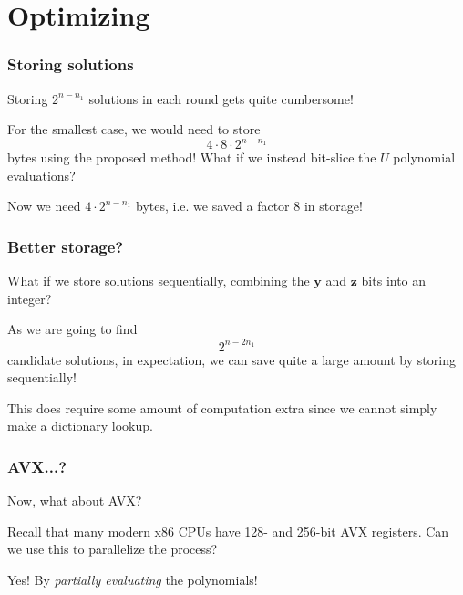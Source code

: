 \documentclass{beamer}
\begin{document}
\section{Optimizing}
    \begin{frame}
        \frametitle{Storing solutions}
        Storing $2^{n - n_1}$ solutions in each round gets quite cumbersome!
        
        \pause 

        For the smallest case, we would need to store 
        $$
            4 \cdot 8 \cdot 2^{n - n_1}
        $$
        bytes using the proposed method! What if we instead bit-slice the $U$ polynomial evaluations?

        \pause 

        Now we need $4\cdot 2^{n - n_1}$ bytes, i.e. we saved a factor 8 in storage!
    \end{frame}


    \begin{frame}
        \frametitle{Better storage?}
        What if we store solutions sequentially, combining the $\mathbf{y}$ and $\mathbf{z}$ bits into an integer?
        
        \pause 

        As we are going to find 
        $$
            2^{n - 2n_1}
        $$
        candidate solutions, in expectation, we can save quite a large amount by storing sequentially!

        This does require some amount of computation extra since we cannot simply make a dictionary lookup.
    \end{frame}

    \begin{frame}
        \frametitle{AVX...?}
        Now, what about AVX? 
        
        \pause

        Recall that many modern x86 CPUs have 128- and 256-bit AVX registers. Can we use this to parallelize the process?

        \pause

        Yes! By \textit{partially evaluating} the polynomials!
    \end{frame}
\end{document}
